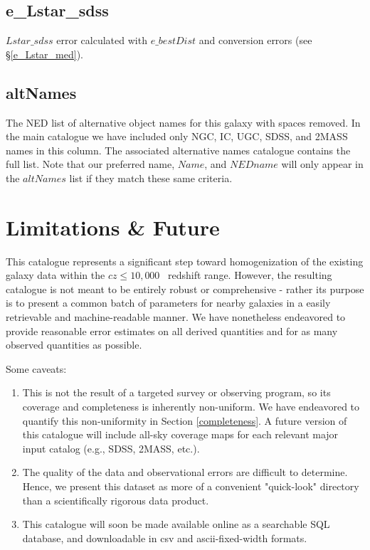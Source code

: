 \subsection{e\_Lstar\_sdss}
$Lstar\_sdss$ error calculated with $e\_bestDist$ and \cite{jester2005} conversion errors (see \S \ref{e_Lstar_med}).


\subsection{altNames}
The NED list of alternative object names for this galaxy with spaces removed. In the main catalogue we have included only NGC, IC, UGC, SDSS, and 2MASS names in this column. The associated alternative names catalogue contains the full list. Note that our preferred name, $Name$, and $NEDname$ will only appear in the $altNames$ list if they match these same criteria.\\


\section{Limitations \& Future}
This catalogue represents a significant step toward homogenization of the existing galaxy data within the $cz \leq 10,000$ \kms~redshift range. However, the resulting catalogue is not meant to be entirely robust or comprehensive - rather its purpose is to present a common batch of parameters for nearby galaxies in a easily retrievable and machine-readable manner. We have nonetheless endeavored to provide reasonable error estimates on all derived quantities and for as many observed quantities as possible.

Some caveats:

\begin{enumerate}

\item{This is not the result of a targeted survey or observing program, so its coverage and completeness is inherently non-uniform. We have endeavored to quantify this non-uniformity in Section \ref{completeness}. A future version of this catalogue will include all-sky coverage maps for each relevant major input catalog (e.g., SDSS, 2MASS, etc.).}

\item{The quality of the data and observational errors are difficult to determine. Hence, we present this dataset as more of a convenient "quick-look" directory than a scientifically rigorous data product.}

\item{This catalogue will soon be made available online as a searchable SQL database, and downloadable in csv and ascii-fixed-width formats.}
\end{enumerate}


